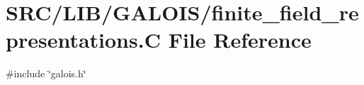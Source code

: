 \hypertarget{finite__field__representations_8_c}{}\section{S\+R\+C/\+L\+I\+B/\+G\+A\+L\+O\+I\+S/finite\+\_\+field\+\_\+representations.C File Reference}
\label{finite__field__representations_8_c}
{\ttfamily \#include \char`\"{}galois.\+h\char`\"{}}\newline
